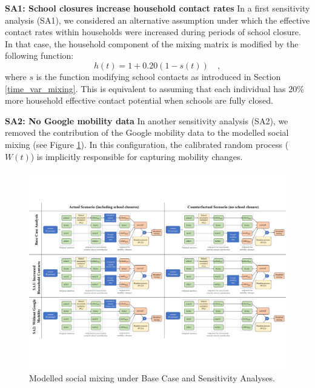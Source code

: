 \vspace{5pt}
\label{sa_descriptions}
\textbf{SA1: School closures increase household contact rates}
In a first sensitivity analysis (SA1), we considered an alternative assumption under which the effective contact rates within households were increased during
periods of school closure. In that case, the household component of the mixing matrix is modified by the following function:
$$ h(t) = 1 + 0.20(1 - s(t)) \quad ,$$ 
where $s$ is the function modifying school contacts as introduced in Section \ref{time_var_mixing}. This is equivalent to assuming
that each individual has 20\% more household effective contact potential when schools are fully closed.

\vspace{5pt}
\textbf{SA2: No Google mobility data}
In another sensitivity analysis (SA2), we removed the contribution of the Google mobility data to the modelled social mixing (see Figure \ref{fig:mixing}). 
In this configuration, the calibrated random process ($W(t)$) is implicitly responsible for capturing mobility changes.


\begin{figure}[h]
  \begin{center}
  \includegraphics[width=1.0\textwidth]{../../tex_descriptions/projects/sm_covid/mixing_multi.pdf}
  \end{center}
  \caption{Modelled social mixing under Base Case and Sensitivity Analyses.
  } 
  \label{fig:mixing}
\end{figure}